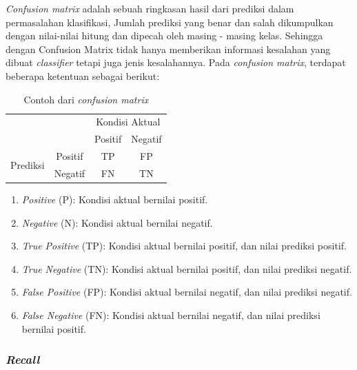 \emph{Confusion matrix} adalah sebuah ringkasan hasil dari prediksi dalam permasalahan klasifikasi,
Jumlah prediksi yang benar dan salah
dikumpulkan dengan nilai-nilai hitung dan dipecah oleh masing - masing
kelas. Sehingga dengan Confusion Matrix tidak hanya memberikan
informasi kesalahan yang dibuat \emph{classifier} tetapi juga jenis
kesalahannya. Pada \emph{confusion matrix}, terdapat beberapa ketentuan sebagai berikut:
\begin{table}[]
  \caption{Contoh dari \emph{confusion matrix}}
  \centering
  \begin{tabular}{ll|cc|}
  \cline{3-4}
                                                  &                              & \multicolumn{2}{c|}{Kondisi Aktual}    \\ \cline{3-4} 
                                                  &                              & \multicolumn{1}{c|}{Positif} & Negatif \\ \hline
  \multicolumn{1}{|c|}{\multirow{2}{*}{Prediksi}} & \multicolumn{1}{c|}{Positif} & \multicolumn{1}{c|}{TP}      & FP      \\ \cline{2-4} 
  \multicolumn{1}{|c|}{}                          & \multicolumn{1}{c|}{Negatif} & \multicolumn{1}{c|}{FN}      & TN      \\ \hline
  \end{tabular}
\end{table}
\begin{enumerate}
  \item \emph{Positive} (P): Kondisi aktual bernilai positif.
  \item \emph{Negative} (N): Kondisi aktual bernilai negatif.
  \item \emph{True Positive} (TP): Kondisi aktual bernilai positif, dan nilai prediksi positif.
  \item \emph{True Negative} (TN): Kondisi aktual bernilai positif, dan nilai prediksi negatif.
  \item \emph{False Positive} (FP): Kondisi aktual bernilai negatif, dan nilai prediksi negatif.
  \item \emph{False Negative} (FN): Kondisi aktual bernilai negatif, dan nilai prediksi bernilai positif.
\end{enumerate}

\subsubsection{\emph{Recall}}
\label{subsec:recall}

